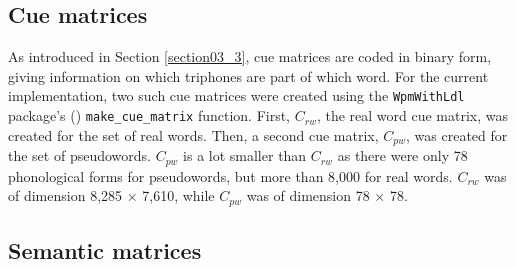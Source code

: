 \subsection{Cue matrices}\label{section05_1_3}

As introduced in Section \ref{section03_3}, cue matrices are coded in binary form, giving information on which triphones are part of which word. For the current implementation, two such cue matrices were created using the \texttt{WpmWithLdl} package’s (\cite{Baayen2019wpm}) \texttt{make\_cue\_matrix} function. First, $C_{rw}$, the real word cue matrix, was created for the set of real words. Then, a second cue matrix, $C_{pw}$, was created for the set of pseudowords. $C_{pw}$ is a lot smaller than $C_{rw}$ as there were only 78 phonological forms for pseudowords, but more than 8,000 for real words. $C_{rw}$ was of dimension 8,285 × 7,610, while $C_{pw}$ was of dimension 78 × 78. 

\subsection{Semantic matrices}\label{section05_1_4}

